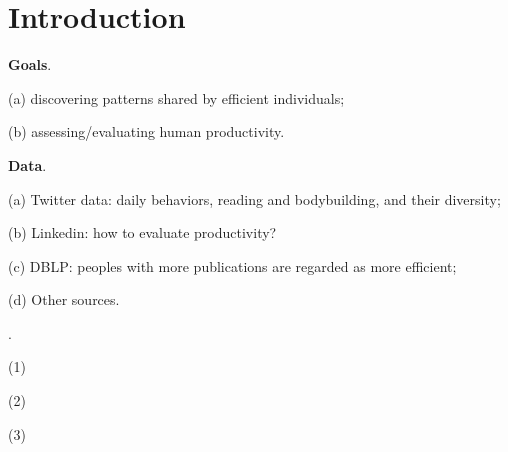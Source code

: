 \section{Introduction}
\label{sec-intro}

{\bf Goals}.

(a) discovering patterns shared by efficient individuals;

(b) assessing/evaluating human productivity.

{\bf Data}. 

(a) Twitter data: daily behaviors, \eg reading and bodybuilding, and their diversity;

(b) Linkedin: how to evaluate productivity?

(c) DBLP: peoples with more publications are regarded as more efficient;

(d) Other sources.



.

\ni (1)

\ni (2)

\ni (3) 